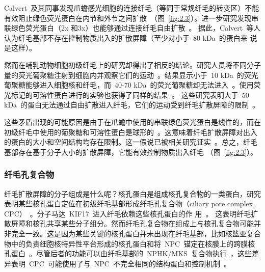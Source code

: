Calvert\ 及其同事发现爪蟾感光细胞的连接纤毛（等同于常规纤毛的转变区）不能有效阻止绿色荧光蛋白在内节和外节之间扩散\ \citep{Calvert2010}（图\ \ref{fig:2.3}）。进一步研究发现串联绿色荧光蛋白（2x 和3x）也能够通过连接纤毛自由扩散\
\citep{Najafi2012}。 据此，Calvert\
等人认为纤毛基部不存在控制物质出入的扩散屏障（至少对小于\ 80 kDa\ 的蛋白来
说是这样）\citep{Najafi2012}。

然而在哺乳动物细胞初级纤毛上的研究却得出了相反的结论。研究人员将不同分子量的荧光葡聚糖注射到细胞内并观察它们的运动\ \citep{Kee2012}。结果显示小于\ 10 kDa\ 的荧光葡聚糖能够进入细胞核和纤毛，而\ 40-70 kDa\ 的荧光葡聚糖却无法进入\ \citep{Kee2012}。使用荧光标记的可溶性蛋白进行的实验也获得了同样的结果\ \citep{Kee2013}。 这些研究表明大于\ 50 kDa\ 的蛋白无法通过自由扩散进入纤毛，它们的运动受到纤毛扩散屏障的限制\ \citep{Kee2013}。

这些矛盾出现的可能原因是由于在爪蟾中使用的串联绿色荧光蛋白是线性的，而在初级纤毛中使用的葡聚糖和可溶性蛋白是球形的\ \citep{Kee2013}。这意味着纤毛扩散屏障对出入的蛋白的大小和空间结构均存在限制。这一假说已被相关研究证实\ \citep{Kee2013,Lin2013}。总之，纤毛基部存在基于分子大小的扩散屏障，它能有效控制物质出入纤毛
（图\ \ref{fig:2.3}）。

\subsubsection{纤毛孔复合物}
纤毛扩散屏障的分子组成是什么呢？核孔蛋白是组成核孔复合物的一类蛋白，研究表明某些核孔蛋白定位在初级纤毛基部形成纤毛孔复合物（ciliary pore complex, CPC）\ \citep{Kee2012,Diener2015}。分子马达\ KIF17\ 进入纤毛依赖这些核孔蛋白的作
用\ \citep{Kee2012}。 这表明纤毛扩散屏障和核孔共享某些分子组分。然而纤毛孔复合物在组成上与核孔复合物可能并非完全一致。这是因为某些关键的核孔蛋白并未出现在纤毛基部，比如核篮亚复合物中的负责细胞核特异性平台形成的核孔蛋白和将\ NPC\
锚定在核膜上的跨膜核孔蛋白\ \citep{Kee2012}。尽管后者的功能可以由纤毛基部的\ NPHK/MKS\ 复合物执行\ \citep{Garcia-Gonzalo2012}，这些差异表明\ CPC\ 可能使用了与\ NPC\ 不完全相同的结构蛋白和控制机制\ \citep{Kee2012}。

